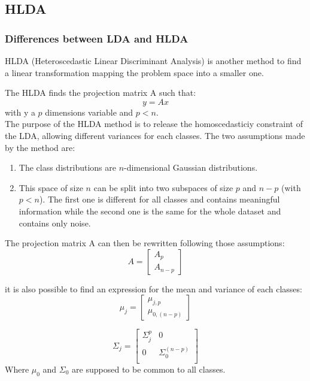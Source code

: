 \subsection{HLDA}

\subsubsection{Differences between LDA and HLDA}

HLDA (Heteroscedastic Linear Discriminant Analysis) is another method to find a linear transformation mapping the problem space into a smaller one.

The HLDA finds the projection matrix A such that:
$$y = Ax$$
with y a $p$ dimensions variable and $p < n$.\\

The purpose of the HLDA method is to release the homoscedasticiy constraint of the LDA, allowing different variances for each classes. The two assumptions made by the method are:

\begin{enumerate}
  \item The class distributions are $n$-dimensional Gaussian distributions.
  \item This space of size $n$ can be split into two subspaces of size $p$
    and $n - p$ (with $p < n$). The first one is different for all classes and contains meaningful information while the second one is the same for the whole dataset and contains only noise.
\end{enumerate}

The projection matrix A can then be rewritten following those assumptions:
$$A = \left [
  \begin{array}{c}
    A_p\\
    A_{n-p}
  \end{array}
\right ]
$$

it is also possible to find an expression for the mean and variance of each classes:
$$\mu_j =
\left [
  \begin{array}{c}
    \mu_{j,p}\\
    \mu_{0,(n-p)}
  \end{array}
\right ]
$$

$$\Sigma_j =
\left [
  \begin{array}{cc}
    \Sigma_j^p & 0\\
    0 & \Sigma_0^{(n-p)}\\
  \end{array}
\right ]
$$
Where $\mu_0$ and $\Sigma_0$ are supposed to be common to all classes.

